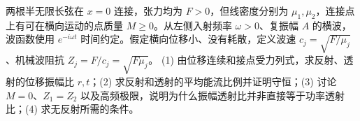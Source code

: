 两根半无限长弦在 \(x=0\) 连接，张力均为 \(F>0\)，但线密度分别为 \(\mu_1,\mu_2\)，连接点上有可在横向运动的点质量 \(M\ge0\)。从左侧入射频率 \(\omega>0\)、复振幅 \(A\) 的横波，波函数使用 \(e^{-i\omega t}\) 时间约定。假定横向位移小、没有耗散，定义波速 \(c_j=\sqrt{F/\mu_j}\)、机械波阻抗 \(Z_j=F/c_j=\sqrt{F\mu_j}\)。
(1) 由位移连续和接点受力列式，求反射、透射的位移振幅比 \(r,t\)；(2) 求反射和透射的平均能流比例并证明守恒；(3) 讨论 \(M=0\)、\(Z_1=Z_2\) 以及高频极限，说明为什么振幅透射比并非直接等于功率透射比；(4) 求无反射所需的条件。
